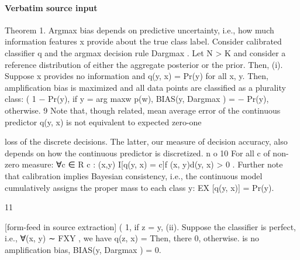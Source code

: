 \documentclass[10pt]{article}
\begin{document}
\paragraph{Verbatim source input}
\begin{ReviewVerbatim}
Theorem 1. Argmax bias depends on predictive uncertainty, i.e., how much information features x provide
about the true class label. Consider calibrated classifier q and the argmax decision rule Dargmax . Let N > K
and consider a reference distribution of either the aggregate posterior or the prior. Then,
  (i). Suppose x provides no information and q(y, x) = Pr(y) for all x, y. Then, amplification bias is
       maximized and all data points are classified as a plurality class:
                                                  (
                                                    1 − Pr(y), if y = arg maxw p(w),
                            BIAS(y, Dargmax ) =
                                                    − Pr(y),      otherwise.
   9 Note that, though related, mean average error of the continuous predictor q(y, x) is not equivalent to expected zero-one

loss of the discrete decisions. The latter, our measure of decision accuracy, also depends on how the continuous predictor is
discretized.                                n                                           o
  10 For all c of non-zero measure: ∀c ∈
                                                 R
                                             c : (x,y) I[q(y, x) = c]f (x, y)d(y, x) > 0 . Further note that calibration implies
Bayesian consistency, i.e., the continuous model cumulatively assigns the proper mass to each class y: EX [q(y, x)] = Pr(y).


                                                              11

[form-feed in source extraction]
                                                                                   (
                                                                                    1,                                                                        if z = y,
  (ii). Suppose the classifier is perfect, i.e., ∀(x, y) ∼ FXY , we have q(z, x) =                                                                                       Then, there
                                                                                    0,                                                                        otherwise.
        is no amplification bias, BIAS(y, Dargmax ) = 0.


\end{ReviewVerbatim}
\end{document}
